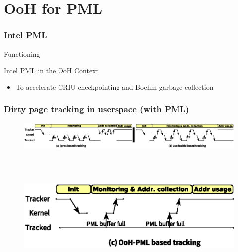 \documentclass[xcolor=table,bigger,unknownkeysallowed]{beamer}
\begin{document}
\section{OoH for PML}
        \begin{frame}
		\thispagestyle{empty}
        \frametitle{Intel PML} 
			\begin{block}{Functioning}
 		    \begin{figure}
				\centering
			\end{figure}
			\end{block}
			\begin{block}{Intel PML in the OoH Context}
				\begin{itemize}
					\item To accelerate CRIU checkpointing and Boehm garbage collection
				\end{itemize}
			\end{block}				
        \end{frame}
        \begin{frame}
        \frametitle{Dirty page tracking in userspace (with PML)} 
 		    \begin{figure}
			\centering
				\includegraphics[width=1\columnwidth]{fig/solutions1}
			\end{figure}
~\\			
~\\
 		    \begin{figure}
			\centering
				\includegraphics[width=.5\columnwidth]{fig/solutions2}				
			\end{figure}							
        \end{frame}          
\end{document}
